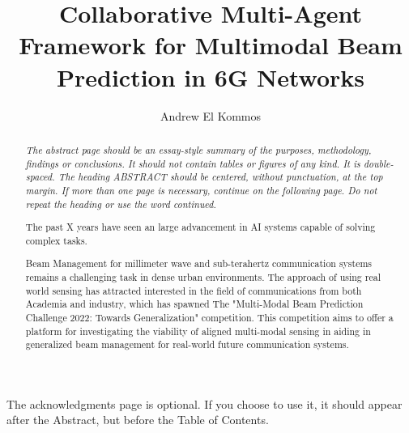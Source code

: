 \documentclass{UCF_ETD}
\title{Collaborative Multi-Agent Framework for Multimodal Beam Prediction in 6G Networks} %
\author{Andrew El Kommos} %
\begin{document}
\frontmatter

\maketitle



\begin{abstract}
\textit{The abstract page should be an essay-style summary of the purposes, methodology, findings or conclusions. It should not contain tables or figures of any kind. It is double-spaced. The heading ABSTRACT should be centered, without punctuation, at the top margin. If more than one page is necessary, continue on the following page. Do not repeat the heading or use the word continued.}

The past X years have seen an large advancement in AI systems capable of solving complex tasks.

Beam Management for millimeter wave and sub-terahertz communication systems remains a challenging task in dense urban environments. The approach of using real world sensing has attracted interested in the field of communications from both Academia and industry, which has spawned The "Multi-Modal Beam Prediction Challenge 2022: Towards Generalization" competition. This competition aims to offer a platform for investigating the viability of aligned multi-modal sensing in aiding in generalized beam management for real-world future communication systems. 


\end{abstract}

\dedication{I dedicate this thesis to my parents, and siblings for supporting me to continue through my education...etc}

\begin{acknowledgments}
The acknowledgments page is optional. If you choose to use it, it should appear after the Abstract, but before the Table of Contents.
\end{acknowledgments}

\tableofcontents

\listoffigures
\end{document}
